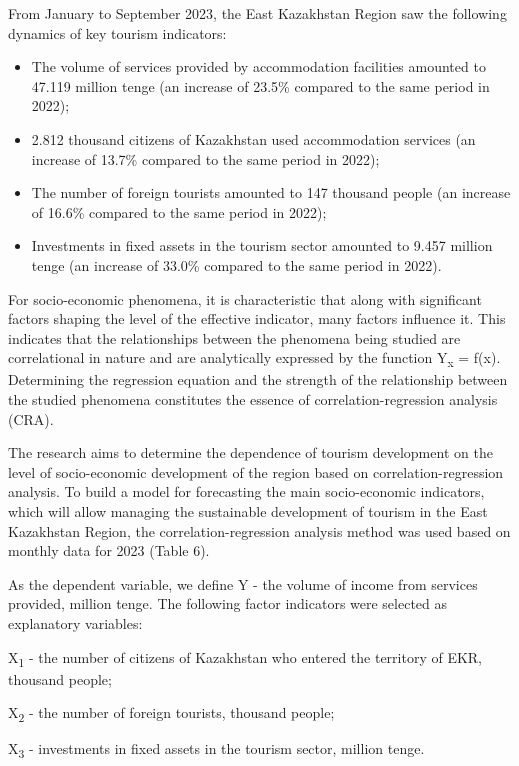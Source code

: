 \begin{multicols}{2}
From January to September 2023, the East Kazakhstan Region saw the
following dynamics of key tourism indicators:

\begin{itemize}
\item
  The volume of services provided by accommodation facilities amounted
  to 47.119 million tenge (an increase of 23.5\% compared to the same
  period in 2022);
\item
  2.812 thousand citizens of Kazakhstan used accommodation services (an
  increase of 13.7\% compared to the same period in 2022);
\item
  The number of foreign tourists amounted to 147 thousand people (an
  increase of 16.6\% compared to the same period in 2022);
\item
  Investments in fixed assets in the tourism sector amounted to 9.457
  million tenge (an increase of 33.0\% compared to the same period in
  2022).
\end{itemize}

For socio-economic phenomena, it is characteristic that along with
significant factors shaping the level of the effective indicator, many
factors influence it. This indicates that the relationships between the
phenomena being studied are correlational in nature and are analytically
expressed by the function Y\textsubscript{x} = f(x). Determining the
regression equation and the strength of the relationship between the
studied phenomena constitutes the essence of correlation-regression
analysis (CRA).

The research aims to determine the dependence of tourism development on
the level of socio-economic development of the region based on
correlation-regression analysis. To build a model for forecasting the
main socio-economic indicators, which will allow managing the
sustainable development of tourism in the East Kazakhstan Region, the
correlation-regression analysis method was used based on monthly data
for 2023 (Table 6).

As the dependent variable, we define Y - the volume of income from
services provided, million tenge. The following factor indicators were
selected as explanatory variables:

X\textsubscript{1} - the number of citizens of Kazakhstan who entered
the territory of EKR, thousand people;

X\textsubscript{2} - the number of foreign tourists, thousand people;

X\textsubscript{3} - investments in fixed assets in the tourism sector,
million tenge.
\end{multicols}

